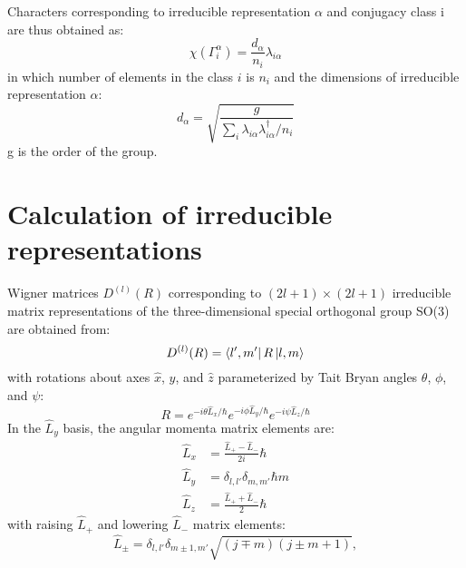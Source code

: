 \documentclass[preprint,showpacs,preprintnumbers,superscriptaddress,prb,floatfix,aps]{revtex4-1}
\begin{document}
Characters corresponding to irreducible representation $\alpha$ and conjugacy class i are thus obtained as:
\begin{equation}
\label{eq:irrep_characters}
\chi\left(\Gamma_i^\alpha\right) = \frac{d_\alpha}{n_i} \lambda_{i\alpha}
\end{equation}
in which number of elements in the class $i$ is $n_i$ and the dimensions of irreducible representation $\alpha$:
\begin{equation}
\label{eq:irrep_dimension}
d_\alpha = \sqrt{ \frac{g}{\sum_i \lambda_{i\alpha} \lambda_{i\alpha}^\dag / n_i }  }
\end{equation}
g is the order of the group.
 

\section{Calculation of irreducible representations}
Wigner matrices $D^{(l)}(R)$ corresponding to $(2l+1)\times(2l+1)$ irreducible matrix representations of the three-dimensional special orthogonal group SO(3) are obtained from:\cite{martin_electronic_2004}
\begin{equation}
\label{eq:imselfenergy}
D^{(l)}(R) = \bra{l',m'} R \ket{l,m}
\end{equation}
with rotations about axes $\hat{x}$, $\hat{y}$, and $\hat{z}$ parameterized by Tait Bryan angles $\theta$, $\phi$, and $\psi$:
\begin{equation}
R = e^{-i\theta\hat{L}_x/\hbar} e^{-i\phi\hat{L}_y/\hbar} e^{-i\psi\hat{L}_z/\hbar}
\end{equation}
%
In the $\hat{L}_y$ basis, the angular momenta matrix elements are:\cite{shankar_fundamentals_2014}
\begin{align}
\label{eq:angular_momenta}
\hat{L}_x & = \frac{\hat{L}_{+}-\hat{L}_{-}}{2i} \hbar \\
\hat{L}_y & = \delta_{l,l'}\delta_{m,m'} \hbar m \\
\hat{L}_z & = \frac{\hat{L}_{+}+\hat{L}_{-}}{2} \hbar
\end{align}
with raising $\hat{L}_+$ and lowering $\hat{L}_-$ matrix elements:
\begin{equation}
\label{eq:raising_lowering_operator}
\hat{L}_{\pm} = \delta_{l,l'}\delta_{m\pm1,m'} \sqrt{(j\mp m)(j\pm m+1)} ,
\end{equation}
\end{document}
